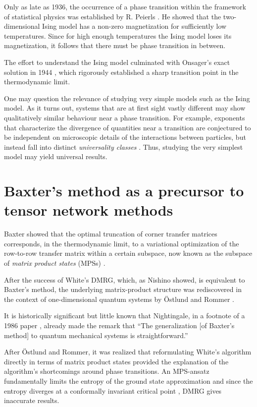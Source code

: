 Only as late as 1936, the occurrence of a phase transition
within the framework of statistical physics was established by R. Peierls
\cite{peierls1936on_ising}. He showed that the two-dimensional Ising model
has a non-zero magnetization for sufficiently low temperatures. Since for
high enough temperatures the Ising model loses its magnetization, it
follows that there must be phase transition in between.

The effort to understand the Ising model culminated with Onsager's exact
solution in 1944 \cite{onsager1944two_dimensional}, which rigorously
established a sharp transition point in the thermodynamic limit.

One may question the relevance of studying very simple models such as the
Ising model. As it turns out, systems that are at first sight vastly
different may show qualitatively similar behaviour near a phase
transition. For example, exponents that characterize the divergence of
quantities near a transition are conjectured to be independent on
microscopic details of the interactions between particles, but instead
fall into distinct \emph{universality classes}
\cite{griffiths1970dependence, fisher1966quantum}. Thus, studying the very
simplest model may yield universal results.

\section{Baxter's method as a precursor to tensor network methods}

Baxter showed that the optimal truncation of corner transfer matrices
corresponds, in the thermodynamic limit, to a variational optimization of
the row-to-row transfer matrix within a certain subspace, now known as the
subspace of \emph{matrix product states} (MPSs) \cite{baxter1968dimers,
baxter1982exactly_ctm}.

After the success of White's DMRG, which, as Nishino showed, is equivalent
to Baxter's method, the underlying matrix-product structure was
rediscovered in the context of one-dimensional quantum systems by Östlund
and Rommer \cite{ostlund1995thermodynamic, rommer1997class}.

It is historically significant but little known that Nightingale, in
a footnote of a 1986 paper \cite{nightingale1986gap}, already made the
remark that \enquote{The generalization [of Baxter's method] to quantum
mechanical systems is straightforward.}

After Östlund and Rommer, it was realized that reformulating White's
algorithm directly in terms of matrix product states provided the
explanation of the algorithm's shortcomings around phase transitions. An
MPS-ansatz fundamentally limits the entropy of the ground state
approximation and since the entropy diverges at a conformally invariant
critical point \cite{calabrese2004entanglement}, DMRG gives inaccurate
results.

